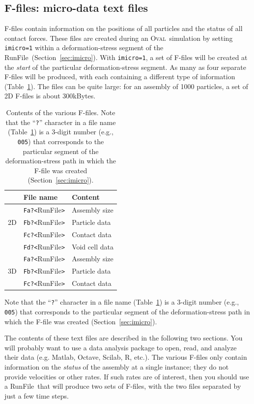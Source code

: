 \documentclass[letterpaper,11pt]{article}
\newcommand{\Oval}{\textsc{Oval}}
\newcommand{\RunFile}{\textsf{RunFile}}
\begin{document}
\subsection{F-files: micro-data text files}\label{sec:ffiles}
F-files contain information on the positions of all particles
and the status of all contact forces.
These files are created during an \Oval\ simulation
by setting \texttt{imicro=1} within a deformation-stress segment
of the \RunFile\ (Section~\ref{sec:imicro}).
With \texttt{imicro=1}, a set of F-files will be created at the \emph{start}
of the particular deformation-stress segment.
As many as four separate F-files will be produced, with each containing
a different type of information (Table~\ref{table:ffiles}).
The files can be quite large:  for an assembly of 1000 particles, 
a set of 2D F-files is about 300kBytes.
\begin{table}
\centering
\begin{tabular}{l|ll}
\hline
\hline
\multicolumn{1}{c}{} & File name & Content\\
\hline
   & \texttt{Fa?<}\RunFile\texttt{>} & Assembly size \\
2D & \texttt{Fb?<}\RunFile\texttt{>} & Particle data \\
   & \texttt{Fc?<}\RunFile\texttt{>} & Contact data \\
   & \texttt{Fd?<}\RunFile\texttt{>} & Void cell data \\
\hline
   & \texttt{Fa?<}\RunFile\texttt{>} & Assembly size \\
3D & \texttt{Fb?<}\RunFile\texttt{>} & Particle data \\
   & \texttt{Fc?<}\RunFile\texttt{>} & Contact data \\
\hline
\hline
\end{tabular}
\caption{Contents of the various F-files.
Note that the ``\texttt{?}'' character in a file name
(Table~\ref{table:ffiles}) is a 3-digit number (e.g., \texttt{005})
that corresponds to the particular
segment of the deformation-stress path in which the F-file was created
(Section~\ref{sec:imicro}).}
\label{table:ffiles}
\end{table}
Note that the ``\texttt{?}'' character in a file name 
(Table~\ref{table:ffiles}) is a 3-digit number (e.g., \texttt{005})
that corresponds to the particular
segment of the deformation-stress path in which the F-file was created
(Section~\ref{sec:imicro}).
\par
The contents of these text files are described in the following two sections.
You will probably want to use a data analysis package
to open, read, and analyze their data (e.g. Matlab, Octave, Scilab, R, etc.).
The various F-files only contain information on the \emph{status}
of the assembly at a single instance; they do not provide
velocities or other rates.
If such rates are of interest, then you should use
a \RunFile\ that will produce two sets of F-files, 
with the two files separated by
just a few time steps.
%
\end{document}
